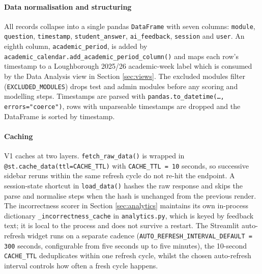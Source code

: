 \paragraph{Data normalisation and structuring}
All records collapse into a single pandas \texttt{DataFrame} with seven columns: \texttt{module}, \texttt{question}, \texttt{timestamp}, \texttt{student\_answer}, \texttt{ai\_feedback}, \texttt{session} and \texttt{user}.
An eighth column, \texttt{academic\_period}, is added by \texttt{academic\_calendar.add\_academic\_period\_column()} and maps each row's timestamp to a Loughborough 2025/26 academic-week label which is consumed by the Data Analysis view in Section \ref{sec:views}.
The excluded modules filter (\texttt{EXCLUDED\_MODULES}) drops test and admin modules before any scoring and modelling steps.
Timestamps are parsed with \texttt{pandas.to\_datetime(\dots, errors="coerce")}, rows with unparseable timestamps are dropped and the DataFrame is sorted by timestamp.

\paragraph{Caching}
V1 caches at two layers.
\texttt{fetch\_raw\_data()} is wrapped in \texttt{@st.cache\_data(ttl=CACHE\_TTL)} with \texttt{CACHE\_TTL = 10} seconds, so successive sidebar reruns within the same refresh cycle do not re-hit the endpoint.
A session-state shortcut in \texttt{load\_data()} hashes the raw response and skips the parse and normalise steps when the hash is unchanged from the previous render.
The incorrectness scorer in Section \ref{sec:analytics} maintains its own in-process dictionary \texttt{\_incorrectness\_cache} in \texttt{analytics.py}, which is keyed by feedback text; it is local to the process and does not survive a restart.
The Streamlit auto-refresh widget runs on a separate cadence (\texttt{AUTO\_REFRESH\_INTERVAL\_DEFAULT = 300} seconds, configurable from five seconds up to five minutes), the 10-second \texttt{CACHE\_TTL} deduplicates within one refresh cycle, whilst the chosen auto-refresh interval controls how often a fresh cycle happens.

